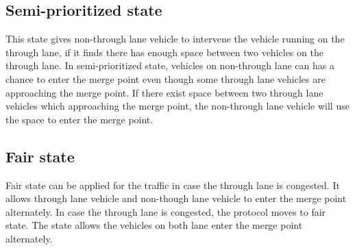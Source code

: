 \documentclass[10pt, conference, compsocconf]{IEEEtran}
\begin{document}


\subsection{Semi-prioritized state}
\label{semi-case}
This state gives non-through lane vehicle to intervene the vehicle running on the through lane, if it finds there has enough space between two vehicles on the through lane. 
In semi-prioritized state, vehicles on non-through lane can has a chance to enter the merge point even though some through lane vehicles are approaching the merge point. 
If there exist space between two through lane vehicles which approaching the merge point, the non-through lane vehicle will use the space to enter the merge point. 


\subsection{Fair state}
Fair state can be applied for the traffic in case the through lane is congested. 
It allows through lane vehicle and non-though lane vehicle to enter the merge point alternately.
In case the through lane is congested, the protocol moves to fair state.
The state allows the vehicles on both lane enter the merge point alternately.
\end{document}
